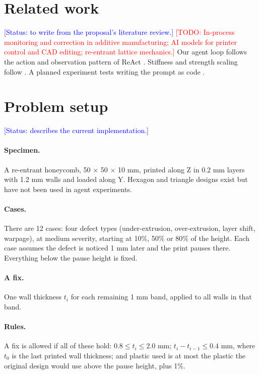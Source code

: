 \documentclass[11pt]{article}
\newcommand{\todo}[1]{\textcolor{red}{[TODO: #1]}}
\newcommand{\status}[1]{\textcolor{blue}{[Status: #1]}}
\begin{document}
\section{Related work}
\status{to write from the proposal's literature review.}
\todo{In-process monitoring and correction in additive manufacturing; AI models for printer control and CAD editing; re-entrant lattice mechanics.}
Our agent loop follows the action and observation pattern of ReAct \cite{yao2023react}. Stiffness and strength scaling follow \cite{gibson1997cellular}. A planned experiment tests writing the prompt as code \cite{puerto2024code}.

\section{Problem setup}
\status{describes the current implementation.}
\paragraph{Specimen.} A re-entrant honeycomb, 50 $\times$ 50 $\times$ 10 mm, printed along Z in 0.2 mm layers with 1.2 mm walls and loaded along Y. Hexagon and triangle designs exist but have not been used in agent experiments.

\paragraph{Cases.} There are 12 cases: four defect types (under-extrusion, over-extrusion, layer shift, warpage), at medium severity, starting at 10\%, 50\% or 80\% of the height. Each case assumes the defect is noticed 1 mm later and the print pauses there. Everything below the pause height is fixed.

\paragraph{A fix.} One wall thickness $t_i$ for each remaining 1 mm band, applied to all walls in that band.

\paragraph{Rules.} A fix is allowed if all of these hold: $0.8 \le t_i \le 2.0$ mm; $t_i - t_{i-1} \le 0.4$ mm, where $t_0$ is the last printed wall thickness; and plastic used is at most the plastic the original design would use above the pause height, plus 1\%.
\end{document}
